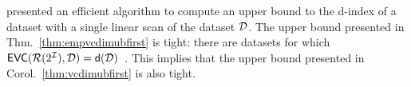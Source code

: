 \citet{RiondatoU12} presented an efficient algorithm to compute an upper bound to
the d-index of a dataset with a single linear scan of the dataset ${\cal D}$.
The upper bound presented in Thm.~\ref{thm:empvcdimubfirst} is tight:
 there are datasets for which
$\mathsf{EVC}(\mathcal{R}(2^{\cal I}),{\cal D})=\mathsf{d}({\cal D})$~\citep{RiondatoU12}.
This implies that the upper bound presented in Corol.~\ref{thm:vcdimubfirst} is
also tight.


